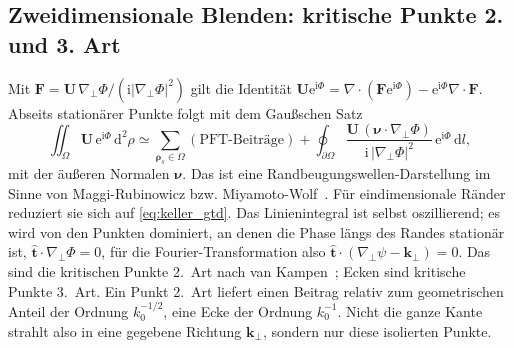 \documentclass[11pt,a4paper]{scrartcl}
\theoremstyle{insightstyle}
\newcommand{\dd}{\mathrm{d}}
\newcommand{\ii}{\mathrm{i}}
\newcommand{\ee}{\mathrm{e}}
\newcommand{\grad}{\nabla_{\!\perp}}
\newcommand{\rh}{\bm{\rho}}
\newcommand{\kp}{\bm{k}_\perp}
\begin{document}
\subsection{Zweidimensionale Blenden: kritische Punkte 2. und 3. Art}
Mit $\bm F=\bm U\,\grad\Phi/(\ii|\grad\Phi|^2)$ gilt die Identität $\bm U\ee^{\ii\Phi}=\nabla\cdot(\bm F\ee^{\ii\Phi})-\ee^{\ii\Phi}\nabla\cdot\bm F$. Abseits stationärer Punkte folgt mit dem Gaußschen Satz
\begin{equation}
    \iint_\Omega\bm U\,\ee^{\ii\Phi}\,\dd^2\rho \simeq \sum_{\rh_s\in\Omega}(\text{PFT-Beiträge}) + \oint_{\partial\Omega}\frac{\bm U\,(\bm\nu\cdot\grad\Phi)}{\ii\,|\grad\Phi|^2}\,\ee^{\ii\Phi}\,\dd l,
    \label{eq:bdw}
\end{equation}
mit der äußeren Normalen $\bm\nu$. Das ist eine Randbeugungswellen-Darstellung im Sinne von Maggi-Rubinowicz bzw. Miyamoto-Wolf~\cite{miyamoto1962a,miyamoto1962b}. Für eindimensionale Ränder reduziert sie sich auf \eqref{eq:keller_gtd}. Das Linienintegral ist selbst oszillierend; es wird von den Punkten dominiert, an denen die Phase längs des Randes stationär ist, $\hat{\bm t}\cdot\grad\Phi=0$, für die Fourier-Transformation also $\hat{\bm t}\cdot(\grad\psi-\kp)=0$. Das sind die kritischen Punkte 2.~Art nach van Kampen~\cite{vankampen1949}; Ecken sind kritische Punkte 3.~Art. Ein Punkt 2.~Art liefert einen Beitrag relativ zum geometrischen Anteil der Ordnung $k_0^{-1/2}$, eine Ecke der Ordnung $k_0^{-1}$. Nicht die ganze Kante strahlt also in eine gegebene Richtung $\kp$, sondern nur diese isolierten Punkte.
\end{document}
